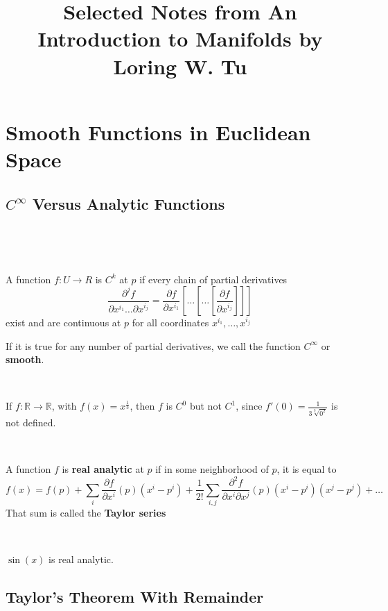 \documentclass{article}
\title{Selected Notes from An Introduction to Manifolds by Loring W. Tu}
\begin{document}
\maketitle

\section{Smooth Functions in Euclidean Space}

\subsection{$C^\infty$ Versus Analytic Functions}
\

\begin{definition}[$C^k$ Functions]
  \

  A function $f: U \to R$ is \textbf{$C^k$} at $p$ if every chain of partial derivatives $$\frac{\partial^j f}{\partial x^{i_1} \dots \partial x^{i_j}} = \frac{\partial f}{\partial x^{i_1}}[ \dots [\dots [\frac{\partial f}{\partial x^{i_j}}]]]$$exist and are continuous at $p$ for all coordinates $x^{i_1}, \dots, x^{i_j}$

  If it is true for any number of partial derivatives, we call the function \textbf{$C^\infty$} or \textbf{smooth}.
\end{definition}

\begin{example}
  \

  If $f: \mathbb{R} \to \mathbb{R}$, with $f(x) = x^\frac{1}{3}$, then $f$ is $C^0$ but not $C^1$, since $f'(0) = \frac{1}{3 \sqrt[3]{0^2}}$ is not defined.
\end{example}

\begin{definition}
  \

  A function $f$ is \textbf{real analytic} at $p$ if in some neighborhood of $p$, it is equal to $$f(x) = f(p) + \sum_i \frac{\partial f}{\partial x^i}(p)(x^i - p^i) + \frac{1}{2!} \sum_{i, j} \frac{\partial^2 f}{\partial x^i \partial x^j}(p)(x^i - p^i)(x^j-p^j) + \dots$$That sum is called the \textbf{Taylor series}
\end{definition}

\begin{example}
  \

  $\sin(x)$ is real analytic.
\end{example}

\subsection{Taylor's Theorem With Remainder}
\
\end{document}
